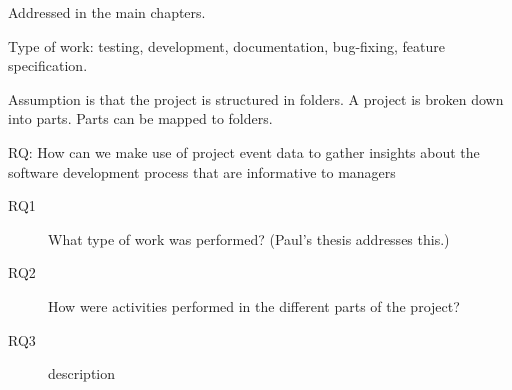 Addressed in the main chapters.

Type of work: testing, development, documentation, bug-fixing, feature specification. 

Assumption is that the project is structured in folders. A project is broken down into parts. Parts can be mapped to folders.

RQ: How can we make use of project event data to gather insights about the software development process that are
informative to managers

\begin{description}
	\item[RQ1] What type of work was performed? 
	(Paul's thesis addresses this.)
	\item[RQ2] How were activities performed in the different parts of the project?
	\item[RQ3] description
\end{description}

